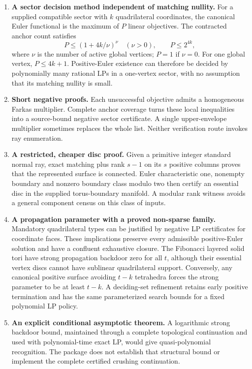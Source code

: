 \begin{enumerate}
\item \textbf{A sector decision method independent of matching nullity.} For a supplied compatible sector with $k$ quadrilateral coordinates, the canonical Euler functional is the maximum of $P$ linear objectives. The contracted anchor count satisfies
\[
 P\le (1+4k/\nu)^\nu\quad(\nu>0),\qquad
 P\le 2^{4k},
\]
where $\nu$ is the number of active global vertices; $P=1$ if $\nu=0$. For one global vertex, $P\le4k+1$. Positive-Euler existence can therefore be decided by polynomially many rational LPs in a one-vertex sector, with no assumption that its matching nullity is small.
\item \textbf{Short negative proofs.} Each unsuccessful objective admits a homogeneous Farkas multiplier. Complete anchor coverage turns these local inequalities into a source-bound negative sector certificate. A single upper-envelope multiplier sometimes replaces the whole list. Neither verification route invokes ray enumeration.
\item \textbf{A restricted, cheaper disc proof.} Given a primitive integer standard normal ray, exact matching plus rank $s-1$ on its $s$ positive columns proves that the represented surface is connected. Euler characteristic one, nonempty boundary and nonzero boundary class modulo two then certify an essential disc in the supplied torus-boundary manifold. A modular rank witness avoids a general component census on this class of inputs.
\item \textbf{A propagation parameter with a proved non-sparse family.} Mandatory quadrilateral types can be justified by negative LP certificates for coordinate faces. These implications preserve every admissible positive-Euler solution and have a confluent exhaustive closure. The Fibonacci layered solid tori have strong propagation backdoor zero for all $t$, although their essential vertex discs cannot have sublinear quadrilateral support. Conversely, any canonical positive surface avoiding $t-k$ tetrahedra forces the strong parameter to be at least $t-k$. A deciding-set refinement retains early positive termination and has the same parameterized search bounds for a fixed polynomial LP policy.
\item \textbf{An explicit conditional asymptotic theorem.} A logarithmic strong backdoor bound, maintained through a complete topological continuation and used with polynomial-time exact LP, would give quasi-polynomial recognition. The package does not establish that structural bound or implement the complete certified crushing continuation.
\end{enumerate}

